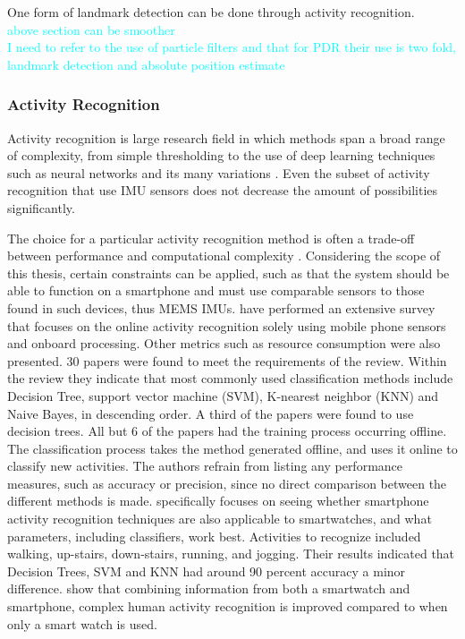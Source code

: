 One form of landmark detection can be done through activity recognition. \\
\textcolor{cyan}{above section can be smoother} \\ \newline
\textcolor{cyan}{ I need to refer to the use of particle filters and that for PDR their use is two fold, landmark detection and absolute position estimate}

\subsubsection{Activity Recognition}
Activity recognition is large research field in which methods span a broad range of complexity, from simple thresholding to the use of deep learning techniques such as neural networks and its many variations \cite{Lima2019}. Even the subset of activity recognition that use IMU sensors does not decrease the amount of possibilities significantly.


The choice for a particular activity recognition method is often a trade-off between performance and computational complexity \cite{Bulling2014}. Considering the scope of this thesis, certain constraints can be applied, such as that the system should be able to function on a smartphone and must use comparable sensors to those found in such devices, thus MEMS IMUs. \citet{Shoaib2015} have performed an extensive survey that focuses on the online activity recognition solely using mobile phone sensors and onboard processing. Other metrics such as resource consumption were also presented. 30 papers were found to meet the requirements of the review. Within the review they indicate that most commonly used classification methods include Decision Tree, support vector machine (SVM), K-nearest neighbor (KNN) and Naive Bayes, in descending order. A third of the papers were found to use decision trees. All but 6 of the papers had the training process occurring offline. The classification process takes the method generated offline, and uses it online to classify new activities. The authors refrain from listing any performance measures, such as accuracy or precision, since no direct comparison between the different methods is made. \citet{Ahmad2020} specifically focuses on seeing whether smartphone activity recognition techniques are also applicable to smartwatches, and what parameters, including classifiers, work best. Activities to recognize included walking, up-stairs, down-stairs, running, and jogging. Their results indicated that  Decision Trees, SVM and KNN had around 90 percent accuracy a minor difference. \citet{Shoaib2016} show that combining information from both a smartwatch and smartphone, complex human activity recognition is improved compared to when only a smart watch is used. 

